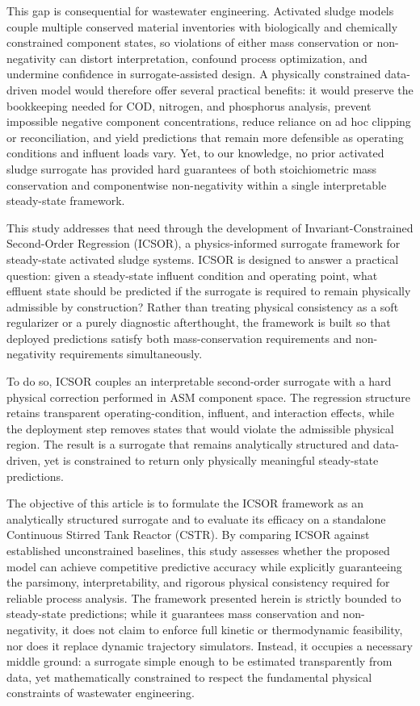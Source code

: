 \documentclass[11pt]{article}
\begin{document}
This gap is consequential for wastewater engineering. Activated sludge models couple multiple conserved material inventories with biologically and chemically constrained component states, so violations of either mass conservation or non-negativity can distort interpretation, confound process optimization, and undermine confidence in surrogate-assisted design. A physically constrained data-driven model would therefore offer several practical benefits: it would preserve the bookkeeping needed for COD, nitrogen, and phosphorus analysis, prevent impossible negative component concentrations, reduce reliance on ad hoc clipping or reconciliation, and yield predictions that remain more defensible as operating conditions and influent loads vary. Yet, to our knowledge, no prior activated sludge surrogate has provided hard guarantees of both stoichiometric mass conservation and componentwise non-negativity within a single interpretable steady-state framework.

This study addresses that need through the development of Invariant-Constrained Second-Order Regression (ICSOR), a physics-informed surrogate framework for steady-state activated sludge systems. ICSOR is designed to answer a practical question: given a steady-state influent condition and operating point, what effluent state should be predicted if the surrogate is required to remain physically admissible by construction? Rather than treating physical consistency as a soft regularizer or a purely diagnostic afterthought, the framework is built so that deployed predictions satisfy both mass-conservation requirements and non-negativity requirements simultaneously.

To do so, ICSOR couples an interpretable second-order surrogate with a hard physical correction performed in ASM component space. The regression structure retains transparent operating-condition, influent, and interaction effects, while the deployment step removes states that would violate the admissible physical region. The result is a surrogate that remains analytically structured and data-driven, yet is constrained to return only physically meaningful steady-state predictions.

The objective of this article is to formulate the ICSOR framework as an analytically structured surrogate and to evaluate its efficacy on a standalone Continuous Stirred Tank Reactor (CSTR). By comparing ICSOR against established unconstrained baselines, this study assesses whether the proposed model can achieve competitive predictive accuracy while explicitly guaranteeing the parsimony, interpretability, and rigorous physical consistency required for reliable process analysis. The framework presented herein is strictly bounded to steady-state predictions; while it guarantees mass conservation and non-negativity, it does not claim to enforce full kinetic or thermodynamic feasibility, nor does it replace dynamic trajectory simulators. Instead, it occupies a necessary middle ground: a surrogate simple enough to be estimated transparently from data, yet mathematically constrained to respect the fundamental physical constraints of wastewater engineering.
\end{document}
